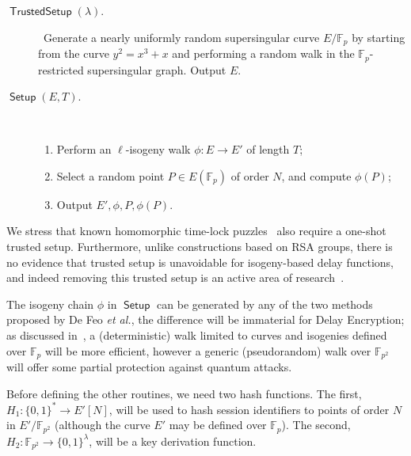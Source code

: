 \documentclass{llncs}
\newcommand{\F}{\mathbb{F}}
\DeclareMathOperator{\Setup}{\mathsf{Setup}}
\DeclareMathOperator{\TSetup}{\mathsf{TrustedSetup}}
\begin{document}
\begin{description}
\item[$\TSetup(\lambda)$.]\
  Generate a nearly uniformly random supersingular curve
  $E/\F_p$ by starting from the curve $y^2=x^3+x$ and performing a
  random walk in the $\F_p$-restricted supersingular graph. %
  Output $E$.
\item[$\Setup(E,T)$.]\
  \begin{enumerate}
  \item Perform an $\ell$-isogeny walk $\phi:E\to E'$ of length $T$;
  \item Select a random point $P\in E(\F_p)$ of order $N$, and compute
    $\phi(P)$;
  \item Output $E',\phi,P,\phi(P)$.
  \end{enumerate}
\end{description}

We stress that known homomorphic time-lock puzzles~\cite{C:MalThy19}
also require a one-shot trusted setup. %
Furthermore, unlike constructions based on RSA groups,
there is no evidence that trusted setup is unavoidable for
isogeny-based delay functions, and indeed removing this trusted setup
is an active area of
research~\cite{10.1007/978-3-030-45724-2_18,love2019supersingular}.

The isogeny chain $\phi$ in $\Setup$ can be generated by any of the
two methods proposed by De Feo \emph{et al.}, the difference will be
immaterial for Delay Encryption; as discussed
in~\cite{10.1007/978-3-030-34578-5_10}, a (deterministic) walk limited
to curves and isogenies defined over $\F_p$ will be more efficient,
however a generic (pseudorandom) walk over $\F_{p^2}$ will offer some
partial protection against quantum attacks.

Before defining the other routines, we need two hash functions. %
The first, $H_1:\{0,1\}^*\to E'[N]$, will be used to hash session
identifiers to points of order $N$ in $E'/\F_{p^2}$ (although the
curve $E'$ may be defined over $\F_p$). %
The second, $H_2:\F_{p^2}\to\{0,1\}^\lambda$, will be a key derivation
function. %
\end{document}
